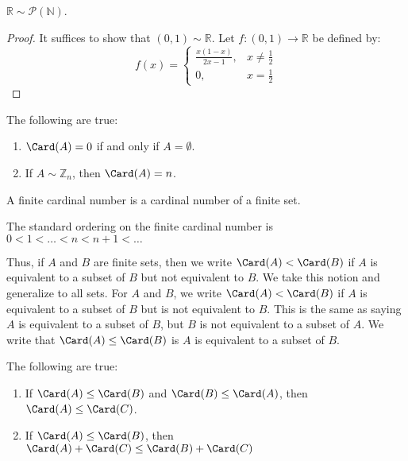         \begin{theorem}
            $\mathbb{R}\sim\mathcal{P}(\mathbb{N})$.
        \end{theorem}
        \begin{proof}
            It suffices to show that $(0,1)\sim\mathbb{R}$.
            Let $f:(0,1)\rightarrow\mathbb{R}$ be defined by:
            \begin{equation}
                f(x)=
                \begin{cases}
                    \frac{x(1-x)}{2x-1},&x\ne\frac{1}{2}\\
                    0,&x=\frac{1}{2}
                \end{cases}
            \end{equation}
        \end{proof}
        \begin{theorem}
            The following are true:
            \begin{enumerate}
                \item $\Card(A)=0$ if and only if $A=\emptyset$.
                \item If ${A}\sim{\mathbb{Z}_{n}}$, then $\Card(A)=n$.
            \end{enumerate}
        \end{theorem}
        \begin{definition}
            A finite cardinal number is a cardinal
            number of a finite set.
        \end{definition}
        \begin{definition}
            The standard ordering on the finite cardinal
            number is $0<1<\hdots<n<n+1<\hdots$
        \end{definition}
        Thus, if $A$ and $B$ are finite sets, then we write $\Card(A)<\Card(B)$ if
        $A$ is equivalent to a subset of $B$ but not equivalent to $B$. We take this
        notion and generalize to all sets. For $A$ and $B$, we write
        $\Card(A)<\Card(B)$ if $A$ is equivalent to a subset of $B$ but is not
        equivalent to $B$. This is the same as saying $A$ is equivalent to a subset
        of $B$, but $B$ is not equivalent to a subset of $A$. We write that
        $\Card(A)\leq\Card(B)$ is $A$ is equivalent to a subset of $B$.
        \begin{theorem}
            The following are true:
            \begin{enumerate}
                \item If $\Card(A)\leq\Card(B)$ and
                      $\Card(B)\leq\Card(A)$, then
                      $\Card(A)\leq\Card(C)$.
                \item If $\Card(A)\leq\Card(B)$, then
                      $\Card(A)+\Card(C)\leq\Card(B)+\Card(C)$
            \end{enumerate}
        \end{theorem}
